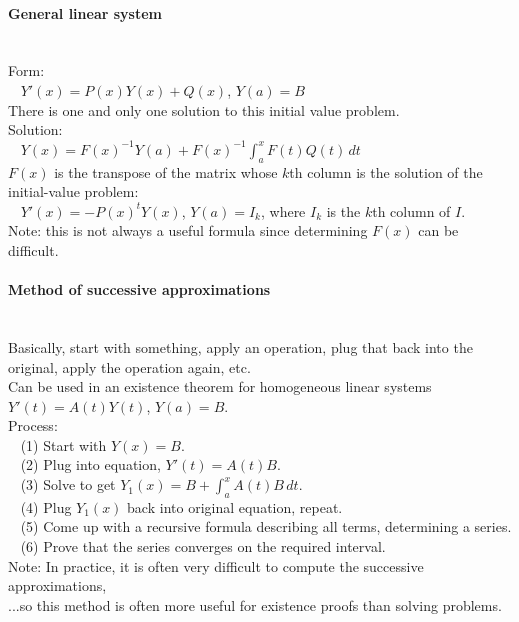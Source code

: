 \documentclass[10pt]{article}
\begin{document}
\paragraph{General linear system}\ \\
Form:\\
$\phantom{x}$ $Y'(x) = P(x)Y(x) + Q(x)$, $Y(a) = B$\\
There is one and only one solution to this initial value problem.\\
Solution:\\
$\phantom{x}$ $Y(x) = F(x)^{-1}Y(a) + F(x)^{-1} \int_a^x F(t)Q(t)\, dt$\\
$F(x)$ is the transpose of the matrix whose $k$th column is the solution of the initial-value problem:\\
$\phantom{x}$ $Y'(x) = -P(x)^t Y(x)$, $Y(a) = I_k$, where $I_k$ is the $k$th column of $I$.\\
Note: this is not always a useful formula since determining $F(x)$ can be difficult.

\paragraph{Method of successive approximations}\ \\
Basically, start with something, apply an operation, plug that back into the original, apply the operation again, etc.\\
Can be used in an existence theorem for homogeneous linear systems $Y'(t) = A(t) Y(t)$, $Y(a) = B$.\\
Process:\\
$\phantom{x}$ (1) Start with $Y(x) = B$.\\
$\phantom{x}$ (2) Plug into equation, $Y'(t) = A(t)B$.\\
$\phantom{x}$ (3) Solve to get $Y_1(x) = B + \int_a^x A(t)B\, dt$.\\
$\phantom{x}$ (4) Plug $Y_1(x)$ back into original equation, repeat.\\
$\phantom{x}$ (5) Come up with a recursive formula describing all terms, determining a series.\\
$\phantom{x}$ (6) Prove that the series converges on the required interval.\\
Note: In practice, it is often very difficult to compute the successive approximations,\\
...so this method is often more useful for existence proofs than solving problems.
\end{document}

